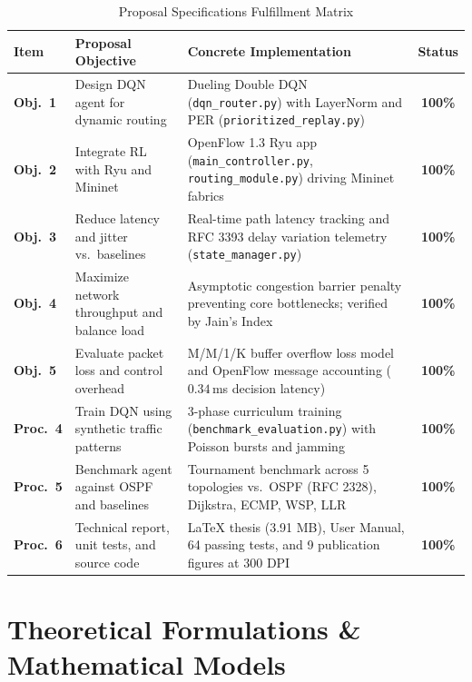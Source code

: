 \documentclass[11pt,a4paper]{article}
\begin{document}
\begin{table}[h]
\centering
\small
\caption{Proposal Specifications Fulfillment Matrix}
\label{tab:proposal_matrix}
\begin{tabularx}{\textwidth}{l p{5.5cm} X c}
\toprule
\textbf{Item} & \textbf{Proposal Objective} & \textbf{Concrete Implementation} & \textbf{Status} \\
\midrule
\textbf{Obj.\ 1} & Design DQN agent for dynamic routing & Dueling Double DQN (\texttt{dqn\_router.py}) with LayerNorm and PER (\texttt{prioritized\_replay.py}) & \textbf{100\%} \\
\textbf{Obj.\ 2} & Integrate RL with Ryu and Mininet & OpenFlow 1.3 Ryu app (\texttt{main\_controller.py}, \texttt{routing\_module.py}) driving Mininet fabrics & \textbf{100\%} \\
\textbf{Obj.\ 3} & Reduce latency and jitter vs.\ baselines & Real-time path latency tracking and RFC 3393 delay variation telemetry (\texttt{state\_manager.py}) & \textbf{100\%} \\
\textbf{Obj.\ 4} & Maximize network throughput and balance load & Asymptotic congestion barrier penalty preventing core bottlenecks; verified by Jain's Index & \textbf{100\%} \\
\textbf{Obj.\ 5} & Evaluate packet loss and control overhead & M/M/1/K buffer overflow loss model and OpenFlow message accounting ($0.34$\,ms decision latency) & \textbf{100\%} \\
\textbf{Proc.\ 4} & Train DQN using synthetic traffic patterns & 3-phase curriculum training (\texttt{benchmark\_evaluation.py}) with Poisson bursts and jamming & \textbf{100\%} \\
\textbf{Proc.\ 5} & Benchmark agent against OSPF and baselines & Tournament benchmark across 5 topologies vs.\ OSPF (RFC 2328), Dijkstra, ECMP, WSP, LLR & \textbf{100\%} \\
\textbf{Proc.\ 6} & Technical report, unit tests, and source code & LaTeX thesis (3.91 MB), User Manual, 64 passing tests, and 9 publication figures at 300 DPI & \textbf{100\%} \\
\bottomrule
\end{tabularx}
\end{table}

\section{Theoretical Formulations \& Mathematical Models}
\end{document}
